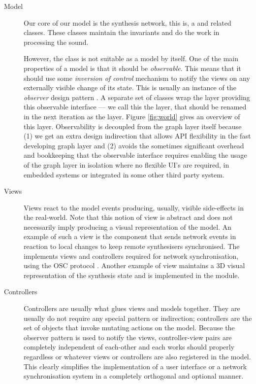 \begin{description}
\item[Model] Our core of our model is the synthesis network, this is,
  a  and related classes. These classes maintain the
  invariants and do the work in processing the sound.

  However, the  class is not suitable as a model by
  itself. One of the main properties of a model is that it should be
  \emph{observable}. This means that it should use some
  \emph{inversion of control} mechanism to notify the views on any
  externally visible change of its state. This is usually an instance
  of the \emph{observer} design pattern \cite{gamma95design,
    vlissides98pattern}. A separate set of classes wrap the
   layer providing this observable interface ---
  we call this the  layer, that should be renamed
  in the next iteration as the  layer. Figure
  \ref{fig:world} gives an overview of this layer. Observability is
  decoupled from the graph layer itself because (1) we get an extra
  design indirection that allows API flexibility in the fast
  developing graph layer and (2) avoids the sometimes significant
  overhead and bookkeeping that the observable interface requires
  enabling the usage of the graph layer in isolation where no flexible
  UI's are required, in embedded systems or integrated in some other
  third party system.

\item[Views] Views react to the model events producing, usually,
  visible side-effects in the real-world. Note that this notion of
  view is abstract and does not necessarily imply producing a visual
  representation of the model. An example of such a view is the
  component that sends network events in reaction to local changes to
  keep remote synthesisers synchronised. The 
  implements views and controllers required for network
  synchronisation, using the OSC protocol \cite{center03osc}. Another
  example of view maintains a 3D visual representation of the
  synthesis state and is implemented in the  module.

\item[Controllers] Controllers are usually what glues views and models
  together. They are usually do not require any special pattern or
  indirection; controllers are the set of objects that invoke mutating
  actions on the model. Because the observer pattern is used to notify
  the views, controller-view pairs are completely independent of
  each-other and each works should properly regardless or whatever
  views or controllers are also registered in the model. This clearly
  simplifies the implementation of a user interface or a network
  synchronisation system in a completely orthogonal and optional
  manner.
\end{description}
